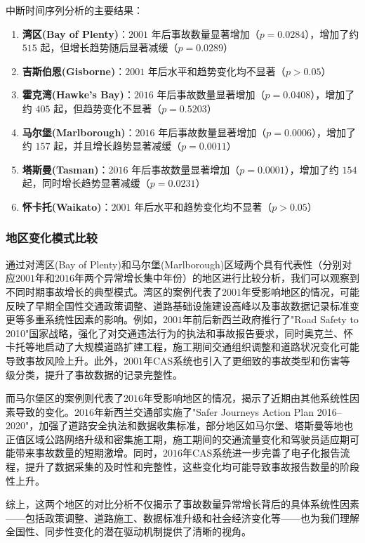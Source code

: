 \documentclass[12pt,a4paper]{article}
\begin{document}
中断时间序列分析的主要结果：

\begin{enumerate}
\item \textbf{湾区(Bay of Plenty)}：$2001$ 年后事故数量显著增加（$p=0.0284$），增加了约 $515$ 起，但增长趋势随后显著减缓（$p=0.0289$）
\item \textbf{吉斯伯恩(Gisborne)}：$2001$ 年后水平和趋势变化均不显著（$p>0.05$）
\item \textbf{霍克湾(Hawke's Bay)}：$2016$ 年后事故数量显著增加（$p=0.0408$），增加了约 $405$ 起，但趋势变化不显著（$p=0.5203$）
\item \textbf{马尔堡(Marlborough)}：$2016$ 年后事故数量显著增加（$p=0.0006$），增加了约 $157$ 起，并且增长趋势显著减缓（$p=0.0011$）
\item \textbf{塔斯曼(Tasman)}：$2016$ 年后事故数量显著增加（$p=0.0001$），增加了约 $154$ 起，同时增长趋势显著减缓（$p=0.0231$）
\item \textbf{怀卡托(Waikato)}：$2001$ 年后水平和趋势变化均不显著（$p>0.05$）
\end{enumerate}

\subsubsection{地区变化模式比较}

通过对湾区(Bay of Plenty)和马尔堡(Marlborough)区域两个具有代表性（分别对应$2001$年和$2016$年两个异常增长集中年份）的地区进行比较分析，我们可以观察到不同时期事故增长的典型模式。湾区的案例代表了$2001$年受影响地区的情况，可能反映了早期全国性交通政策调整、道路基础设施建设高峰以及事故数据记录标准变更等多重系统性因素的影响。例如，$2001$年前后新西兰政府推行了"Road Safety to 2010"国家战略，强化了对交通违法行为的执法和事故报告要求，同时奥克兰、怀卡托等地启动了大规模道路扩建工程，施工期间交通组织调整和道路状况变化可能导致事故风险上升。此外，$2001$年CAS系统也引入了更细致的事故类型和伤害等级分类，提升了事故数据的记录完整性。

而马尔堡区的案例则代表了$2016$年受影响地区的情况，揭示了近期由其他系统性因素导致的变化。$2016$年新西兰交通部实施了"Safer Journeys Action Plan 2016–2020"，加强了道路安全执法和数据收集标准，部分地区如马尔堡、塔斯曼等地也正值区域公路网络升级和密集施工期，施工期间的交通流量变化和驾驶员适应期可能带来事故数量的短期激增。同时，$2016$年CAS系统进一步完善了电子化报告流程，提升了数据采集的及时性和完整性，这些变化均可能导致事故报告数量的阶段性上升。

综上，这两个地区的对比分析不仅揭示了事故数量异常增长背后的具体系统性因素——包括政策调整、道路施工、数据标准升级和社会经济变化等——也为我们理解全国性、同步性变化的潜在驱动机制提供了清晰的视角。
\end{document}
